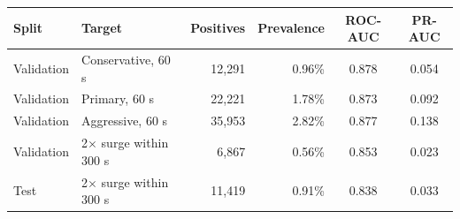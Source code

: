 \begin{tabular}{llrrcc}
\toprule
Split & Target & Positives & Prevalence & ROC-AUC & PR-AUC \\
\midrule
Validation & Conservative, 60 s & 12{,}291 & 0.96\% & 0.878 & 0.054 \\
Validation & Primary, 60 s & 22{,}221 & 1.78\% & 0.873 & 0.092 \\
Validation & Aggressive, 60 s & 35{,}953 & 2.82\% & 0.877 & 0.138 \\
Validation & 2$\times$ surge within 300 s & 6{,}867 & 0.56\% & 0.853 & 0.023 \\
Test & 2$\times$ surge within 300 s & 11{,}419 & 0.91\% & 0.838 & 0.033 \\
\bottomrule
\end{tabular}
